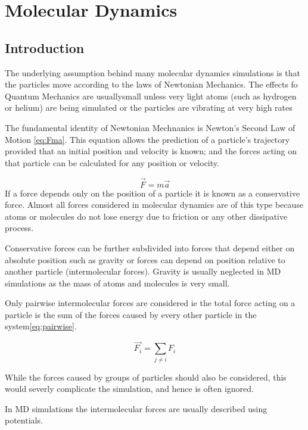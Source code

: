 \documentclass[12pt]{UoAthesis}
\begin{document}
\chapter{Molecular Dynamics} \section{Introduction} The underlying assumption
behind many molecular dynamics simulations is that the particles move according
to the laws of Newtonian Mechanics. The effects fo Quantum Mechanics are
usuallysmall unless very light atoms (such as hydrogen or helium) are being
simulated
or the particles are vibrating at very high rates \cite{Frenkel2002}

The fundamental identity of Newtonian Mechnanics is Newton's Second Law of
Motion \eqref{eq:Fma}. This equation allows the prediction of a particle's
trajectory provided that an initial position and velocity is known; and the
forces acting on that particle can be calculated for any position or velocity.

\begin{equation} \vec{F} = m \vec{a} \label{eq:Fma} \end{equation}
If a force depends only on the position of a particle it is known as a
conservative force. Almost all forces considered in molecular dynamics are of
this type because atoms or molecules do not lose energy due to friction or any
other dissipative process.

Conservative forces can be further subdivided into forces that depend either on
absolute position such as gravity or forces can depend on position relative to
another particle (intermolecular forces). Gravity is usually neglected in MD
simulations as the mass of atoms and molecules is very small.

Only pairwise intermolecular forces are considered ie the total force acting on
a particle is the sum of the forces caused by every other particle in the
system\eqref{eq:pairwise}.

\begin{equation} \vec{F_i} = \sum_{j \not= i}^{}F_{i} \label{eq:pairwise}
\end{equation}

While the forces caused by groups of particles should also be considered, this
would severly complicate the simulation, and hence is often ignored.

In MD simulations the intermolecular forces are usually described using
potentials.
\end{document}
